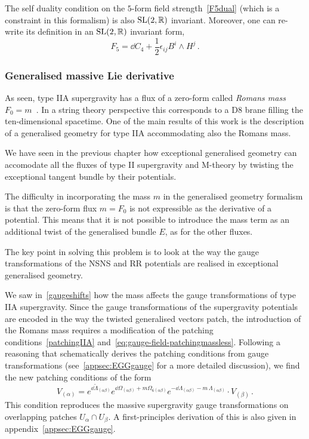 \documentclass[debug]{phd}
\begin{document}
				The self duality condition on the $5$-form field strength~\eqref{F5dual} (which is a constraint in this formalism) is also $\mathrm{SL}(2,\mathbb{R})$ invariant.
				Moreover, one can re-write its definition in an $\mathrm{SL}(2,\mathbb{R})$ invariant form,
						\begin{equation}
							F_5 = \dd C_4 + \frac{1}{2} \epsilon_{ij} B^i \wedge H^j \, .
						\end{equation}
				
					\subsubsection{Generalised massive Lie derivative}\label{sec:massive_genLie}
						As seen, type IIA supergravity has a flux of a zero-form called \emph{Romans mass} $F_0 = m$~\cite{RomansMass}.
						In a string theory perspective this corresponds to a D$8$ brane filling the ten-dimensional spacetime.
						One of the main results of this work is the description of a generalised geometry for type IIA accommodating also the Romans mass.
						
						We have seen in the previous chapter how exceptional generalised geometry can accomodate all the fluxes of type II supergravity and M-theory by twisting the exceptional tangent bundle by their potentials.
					
						The difficulty in incorporating the mass $m$ in the generalised geometry formalism is that the zero-form flux $m = F_0$ is not expressible as the derivative of a potential.
						This means that it is not possible to introduce the mass term as an additional twist of the generalised bundle $E$, as for the other fluxes.
						
						The key point in solving this problem is to look at the way the gauge transformations of the NSNS and RR potentials are realised in exceptional generalised geometry.
						
						We saw in~\eqref{gaugeshifts} how the mass affects the gauge transformations of type IIA supergravity.
						Since the gauge transformations of the supergravity potentials are encoded in the way the twisted generalised vectors patch, the introduction of the Romans mass requires a modification of the patching conditions~\eqref{patchingIIA} and~\eqref{eq:gauge-field-patchingmassless}.
						Following a reasoning that schematically derives the patching conditions from gauge transformations (see~\cref{appsec:EGGgauge} for a more detailed discussion), we find the new patching conditions of the form
								\begin{equation}\label{patching_m}
									V_{(\alpha)} = e^{\dd \tilde \Lambda_{(\alpha \beta)}} e^{\dd \Omega_{(\alpha \beta)} + m \Omega_{6(\alpha\beta)} } e^{-\dd \Lambda_{(\alpha \beta)} - m\,\Lambda_{(\alpha\beta)}} \cdot V_{(\beta)} \, .
								\end{equation}
						This condition reproduces the massive supergravity gauge transformations on overlapping patches $U_\alpha \cap U_\beta$.
						A first-principles derivation of this is also given in appendix~\ref{appsec:EGGgauge}.
						
\end{document}
